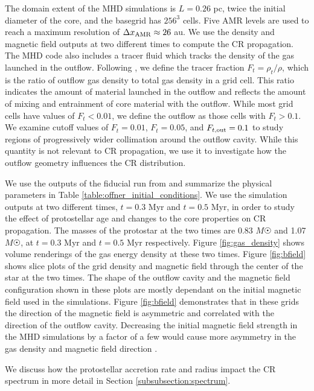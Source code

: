 \documentclass[twocolumn]{aastex63}
\begin{document}
The domain extent of the MHD simulations is $L=0.26$ pc, twice the initial diameter of the core, and the basegrid has $256^3$ cells. Five AMR levels are used to reach a maximum resolution of $\Delta x_{\rm AMR} \approx 26$ au. We use the density and magnetic field outputs at two different times to compute the CR propagation. The MHD code also includes a tracer fluid which tracks the density of the gas launched in the outflow. Following \cite{offner_2017_impact}, we define the tracer fraction $F_t=\rho_t/\rho$, which is the ratio of outflow gas density to total gas density in a grid cell. This ratio indicates the amount of material launched in the outflow and reflects the amount of mixing and entrainment of core material with the outflow. While most grid cells have values of $F_t < 0.01$, we define the outflow as those cells with $F_t > 0.1$. We examine cutoff values of $F_t=0.01$, $F_t=0.05$, and $F_{t,\rm out}=0.1$ to study regions of progressively wider collimation around the outflow cavity. While this quantity is not relevant to CR propagation, we use it to investigate how the outflow geometry influences the CR distribution.

We use the outputs of the fiducial run from \cite{offner_2017_impact} and summarize the physical parameters in Table \ref{table:offner_initial_conditions}. We use the simulation outputs at two different times, $t=0.3$ Myr and $t=0.5$ Myr, in order to study the effect of protostellar age and changes to the core properties on CR propagation. The masses of the protostar at the two times are 0.83 $M\astrosun$ and 1.07 $M\astrosun$, at $t=0.3$ Myr and $t=0.5$ Myr respectively. Figure \ref{fig:gas_density} shows volume renderings of the gas energy density at these two times. Figure \ref{fig:bfield} shows slice plots of the grid density and magnetic field through the center of the star at the two times. The shape of the outflow cavity and the magnetic field configuration shown in these plots are mostly dependant on the initial magnetic field used in the \cite{offner_2017_impact} simulations. Figure \ref{fig:bfield} demonstrates that in these grids the direction of the magnetic field is asymmetric and correlated with the direction of the outflow cavity. Decreasing the initial magnetic field strength in the MHD simulations by a factor of a few would cause more asymmetry in the gas density and magnetic field direction \citep{lee_2017_bfield}. 

We discuss how the protostellar accretion rate and radius impact the CR spectrum in more detail in Section \ref{subsubsection:spectrum}.
\end{document}
